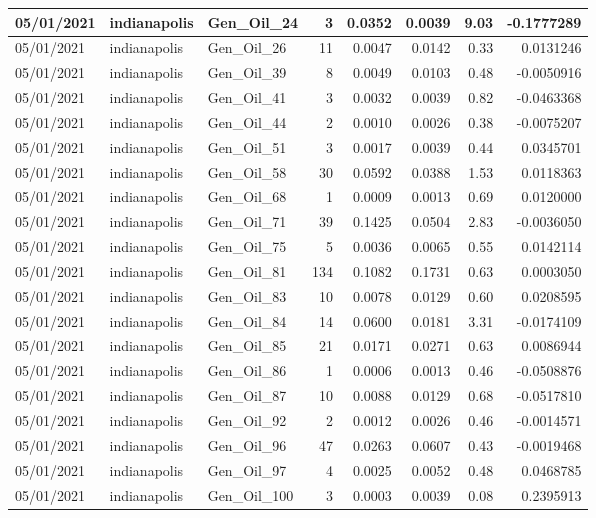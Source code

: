 \documentclass[
  letterpaper,
  DIV=11,
  numbers=noendperiod]{scrartcl}
\begin{document}
\begin{tabular}{l|l|l|r|r|r|r|r}
\hline
05/01/2021 & indianapolis & Gen\_Oil\_24 & 3 & 0.0352 & 0.0039 & 9.03 & -0.1777289\\
\hline
05/01/2021 & indianapolis & Gen\_Oil\_26 & 11 & 0.0047 & 0.0142 & 0.33 & 0.0131246\\
\hline
05/01/2021 & indianapolis & Gen\_Oil\_39 & 8 & 0.0049 & 0.0103 & 0.48 & -0.0050916\\
\hline
05/01/2021 & indianapolis & Gen\_Oil\_41 & 3 & 0.0032 & 0.0039 & 0.82 & -0.0463368\\
\hline
05/01/2021 & indianapolis & Gen\_Oil\_44 & 2 & 0.0010 & 0.0026 & 0.38 & -0.0075207\\
\hline
05/01/2021 & indianapolis & Gen\_Oil\_51 & 3 & 0.0017 & 0.0039 & 0.44 & 0.0345701\\
\hline
05/01/2021 & indianapolis & Gen\_Oil\_58 & 30 & 0.0592 & 0.0388 & 1.53 & 0.0118363\\
\hline
05/01/2021 & indianapolis & Gen\_Oil\_68 & 1 & 0.0009 & 0.0013 & 0.69 & 0.0120000\\
\hline
05/01/2021 & indianapolis & Gen\_Oil\_71 & 39 & 0.1425 & 0.0504 & 2.83 & -0.0036050\\
\hline
05/01/2021 & indianapolis & Gen\_Oil\_75 & 5 & 0.0036 & 0.0065 & 0.55 & 0.0142114\\
\hline
05/01/2021 & indianapolis & Gen\_Oil\_81 & 134 & 0.1082 & 0.1731 & 0.63 & 0.0003050\\
\hline
05/01/2021 & indianapolis & Gen\_Oil\_83 & 10 & 0.0078 & 0.0129 & 0.60 & 0.0208595\\
\hline
05/01/2021 & indianapolis & Gen\_Oil\_84 & 14 & 0.0600 & 0.0181 & 3.31 & -0.0174109\\
\hline
05/01/2021 & indianapolis & Gen\_Oil\_85 & 21 & 0.0171 & 0.0271 & 0.63 & 0.0086944\\
\hline
05/01/2021 & indianapolis & Gen\_Oil\_86 & 1 & 0.0006 & 0.0013 & 0.46 & -0.0508876\\
\hline
05/01/2021 & indianapolis & Gen\_Oil\_87 & 10 & 0.0088 & 0.0129 & 0.68 & -0.0517810\\
\hline
05/01/2021 & indianapolis & Gen\_Oil\_92 & 2 & 0.0012 & 0.0026 & 0.46 & -0.0014571\\
\hline
05/01/2021 & indianapolis & Gen\_Oil\_96 & 47 & 0.0263 & 0.0607 & 0.43 & -0.0019468\\
\hline
05/01/2021 & indianapolis & Gen\_Oil\_97 & 4 & 0.0025 & 0.0052 & 0.48 & 0.0468785\\
\hline
05/01/2021 & indianapolis & Gen\_Oil\_100 & 3 & 0.0003 & 0.0039 & 0.08 & 0.2395913\\

\end{tabular}
\end{document}
